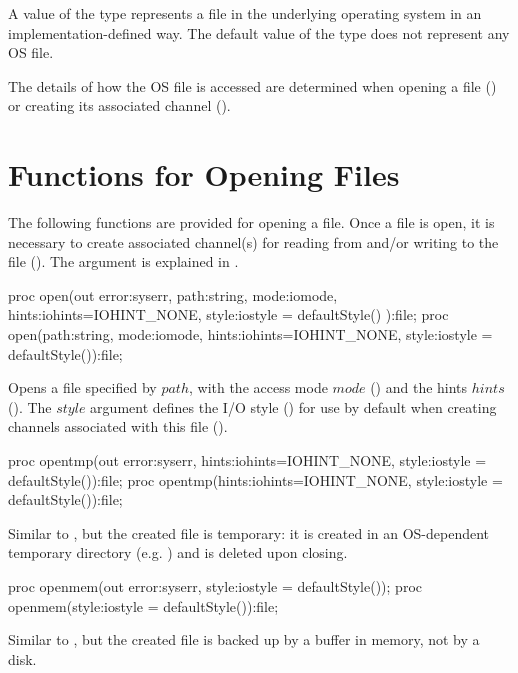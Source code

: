 A value of the  type represents a file in the underlying
operating system in an implementation-defined way. The default value
of the  type does not represent any OS file.

The details of how the OS file is accessed are determined
when opening a file ()
or creating its associated channel ().


\section{Functions for Opening Files}
\label{IO_open_file}

The following functions are provided for opening a file.
Once a file is open, it is necessary to create associated channel(s)
for reading from and/or writing to the file ().
The  argument is explained in .

\begin{protohead}
proc open(out error:syserr, path:string, mode:iomode, hints:iohints=IOHINT_NONE, style:iostyle = defaultStyle()
          ):file;
proc open(path:string, mode:iomode, hints:iohints=IOHINT_NONE, style:iostyle = defaultStyle()):file;
\end{protohead}
\begin{protobody}
Opens a file specified by $path$, with
the access mode $mode$ ()
and the hints $hints$ ().
The $style$ argument defines the I/O style ()
for use by default when creating channels associated with this file
().
\end{protobody}

\begin{protohead}
proc opentmp(out error:syserr, hints:iohints=IOHINT_NONE, style:iostyle = defaultStyle()):file;
proc opentmp(hints:iohints=IOHINT_NONE, style:iostyle = defaultStyle()):file;
\end{protohead}
\begin{protobody}
Similar to , but the created file is temporary:
it is created in an OS-dependent temporary directory (e.g. )
and is deleted upon closing.
\end{protobody}

\begin{protohead}
proc openmem(out error:syserr, style:iostyle = defaultStyle());
proc openmem(style:iostyle = defaultStyle()):file;
\end{protohead}
\begin{protobody}
Similar to , but
the created file is backed up by a buffer in memory, not by a disk.
\end{protobody}


